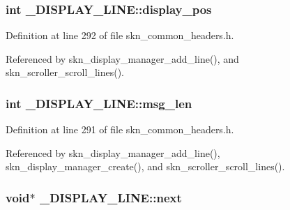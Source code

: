 \hypertarget{struct___d_i_s_p_l_a_y___l_i_n_e_af32b1aa2ce817c27695d7cd43db9364d}{
\subsubsection[{display\+\_\+pos}]{\setlength{\rightskip}{0pt plus 5cm}int \+\_\+\+D\+I\+S\+P\+L\+A\+Y\+\_\+\+L\+I\+N\+E\+::display\+\_\+pos}}\label{struct___d_i_s_p_l_a_y___l_i_n_e_af32b1aa2ce817c27695d7cd43db9364d}


Definition at line 292 of file skn\+\_\+common\+\_\+headers.\+h.



Referenced by skn\+\_\+display\+\_\+manager\+\_\+add\+\_\+line(), and skn\+\_\+scroller\+\_\+scroll\+\_\+lines().

\hypertarget{struct___d_i_s_p_l_a_y___l_i_n_e_aa9cfa1dd3e90386f675fef61e711342e}{
\subsubsection[{msg\+\_\+len}]{\setlength{\rightskip}{0pt plus 5cm}int \+\_\+\+D\+I\+S\+P\+L\+A\+Y\+\_\+\+L\+I\+N\+E\+::msg\+\_\+len}}\label{struct___d_i_s_p_l_a_y___l_i_n_e_aa9cfa1dd3e90386f675fef61e711342e}


Definition at line 291 of file skn\+\_\+common\+\_\+headers.\+h.



Referenced by skn\+\_\+display\+\_\+manager\+\_\+add\+\_\+line(), skn\+\_\+display\+\_\+manager\+\_\+create(), and skn\+\_\+scroller\+\_\+scroll\+\_\+lines().

\hypertarget{struct___d_i_s_p_l_a_y___l_i_n_e_a0668a4de4eb91d9bbd03cc52b00f4fd0}{
\subsubsection[{next}]{\setlength{\rightskip}{0pt plus 5cm}void$\ast$ \+\_\+\+D\+I\+S\+P\+L\+A\+Y\+\_\+\+L\+I\+N\+E\+::next}}\label{struct___d_i_s_p_l_a_y___l_i_n_e_a0668a4de4eb91d9bbd03cc52b00f4fd0}


